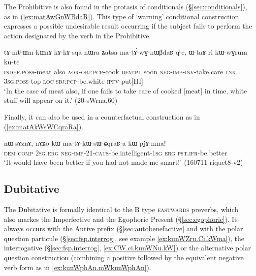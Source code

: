 The Prohibitive is also found in the protasis of conditionals (§\ref{sec:conditionals}), as in (\ref{ex:matAwGnWBdaR}). This type of `warning' conditional construction expresses a possible undesirable result occurring if the subject fails to perform the action designated by the verb in the Prohibitive.

\begin{exe}
\ex  \label{ex:matAwGnWBdaR}
\gll  tɤ-mtʰɯm kɯnɤ kɤ-kɤ-sqa nɯra ʑatsa ma-tɤ́-wɣ-nɯβdaʁ qʰe, ɯ-taʁ ri kɯ-wɣrum ku-te \\
\textsc{indef}.\textsc{poss}-meat also \textsc{aor}-\textsc{obj}:\textsc{pcp}-cook \textsc{dem}:\textsc{pl} soon \textsc{neg}-\textsc{imp}-\textsc{inv}-take.care \textsc{lnk} \textsc{3sg}.\textsc{poss}-top \textsc{loc} \textsc{sbj}:\textsc{pcp}-be.white \textsc{ipfv}-put[III] \\
\glt `In the case of meat also, if one fails to take care of cooked [meat] in time, white stuff will appear on it.' (20-sWrna,60)
\end{exe}
 
Finally, it can also be used in a counterfactual construction as in (\ref{ex:matAkWsWCqraRa}).

\begin{exe}
\ex  \label{ex:matAkWsWCqraRa}
\gll nɯ sɤznɤ, nɤʑo kɯ ma-tɤ-kɯ-sɯ-ɕqraʁ-a kɯ pjɤ-mna! \\
\textsc{dem} \textsc{comp} \textsc{2sg} \textsc{erg} \textsc{neg}-\textsc{imp}-2\fl{}1-\textsc{caus}-be.intelligent-\textsc{1sg} \textsc{erg} \textsc{pst}.\textsc{ifr}-be.better \\
\glt `It would have been better if you had not made me smart!' (160711 riquet8-v2) 
\end{exe}

\subsection{Dubitative} \label{sec:dubitative}
The Dubitative  is formally identical to the B type \textsc{eastwards} preverbs, which also markes the Imperfective and the Egophoric Present (§\ref{sec:egophoric}). It always occurs with the Autive  prefix (§\ref{sec:autobenefactive}  and with the polar question  particule (§\ref{sec:fsp.interrog}, see example \ref{ex:kunWZru.Ci.kWma}), the interrogative  (§\ref{sec:fsp.interrog}, \ref{ex:CW.ci.kunWNu.kW}) or the alternative polar question construction (combining a positive followed by the equivalent negative verb form as in \ref{ex:kunWphAn.mWkunWphAn}).
 
